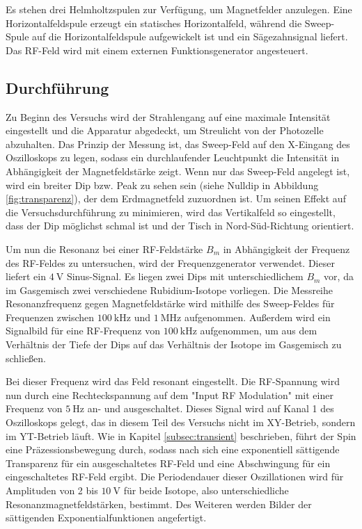   Es stehen drei Helmholtzspulen zur Verfügung, um Magnetfelder anzulegen. Eine Horizontalfeldspule erzeugt ein statisches Horizontalfeld, während die Sweep-Spule auf die Horizontalfeldspule aufgewickelt ist und ein Sägezahnsignal liefert. Das RF-Feld wird mit einem externen Funktionsgenerator angesteuert.

  \subsection{Durchführung}

  Zu Beginn des Versuchs wird der Strahlengang auf eine maximale Intensität eingestellt und die Apparatur abgedeckt, um Streulicht von der Photozelle abzuhalten.
  Das Prinzip der Messung ist, das Sweep-Feld auf den X-Eingang des Oszilloskops zu legen, sodass ein durchlaufender Leuchtpunkt die Intensität in Abhängigkeit der Magnetfeldstärke zeigt.
  Wenn nur das Sweep-Feld angelegt ist, wird ein breiter Dip bzw. Peak zu sehen sein (siehe Nulldip in Abbildung \ref{fig:transparenz}), der dem Erdmagnetfeld zuzuordnen ist. Um seinen Effekt auf die Versuchsdurchführung zu minimieren, wird das Vertikalfeld so eingestellt, dass der Dip möglichst schmal ist und der Tisch in Nord-Süd-Richtung orientiert.

  Um nun die Resonanz bei einer RF-Feldstärke $B_m$ in Abhängigkeit der Frequenz des RF-Feldes zu untersuchen, wird der Frequenzgenerator verwendet. Dieser liefert ein $\SI{4}{\volt}$ Sinus-Signal. Es liegen zwei Dips mit unterschiedlichem $B_m$ vor, da im Gasgemisch zwei verschiedene Rubidium-Isotope vorliegen. Die Messreihe Resonanzfrequenz gegen Magnetfeldstärke wird mithilfe des Sweep-Feldes für Frequenzen zwischen $\SI{100}{\kilo\hertz}$ und $\SI{1}{\mega\hertz}$ aufgenommen.
  Außerdem wird ein Signalbild für eine RF-Frequenz von $\SI{100}{\kilo\hertz}$ aufgenommen, um aus dem Verhältnis der Tiefe der Dips auf das Verhältnis der Isotope im Gasgemisch zu schließen.

  Bei dieser Frequenz wird das Feld resonant eingestellt. Die RF-Spannung wird nun durch eine Rechteckspannung auf dem "Input RF Modulation" mit einer Frequenz von $\SI{5}{\hertz}$ an- und ausgeschaltet. Dieses Signal wird auf Kanal 1 des Oszilloskops gelegt, das in diesem Teil des Versuchs nicht im XY-Betrieb, sondern im YT-Betrieb läuft. Wie in Kapitel \ref{subsec:transient} beschrieben, führt der Spin eine Präzessionsbewegung durch, sodass nach sich eine exponentiell sättigende Transparenz für ein ausgeschaltetes RF-Feld und eine Abschwingung für ein eingeschaltetes RF-Feld ergibt. Die Periodendauer dieser Oszillationen wird für Amplituden von 2 bis $\SI{10}{\volt}$ für beide Isotope, also unterschiedliche Resonanzmagnetfeldstärken, bestimmt.
  Des Weiteren werden Bilder der sättigenden Exponentialfunktionen angefertigt.
